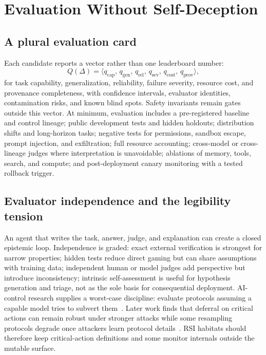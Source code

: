 \documentclass[11pt,a4paper]{article}
\begin{document}
\section{Evaluation Without Self-Deception}\label{sec:evaluation}

\subsection{A plural evaluation card}

Each candidate reports a vector rather than one leaderboard number:
\begin{equation}\label{eq:card}
Q(\Delta) = \bigl\langle q_{\text{cap}},\, q_{\text{gen}},\, q_{\text{rel}},\, q_{\text{sev}},\, q_{\text{cost}},\, q_{\text{prov}} \bigr\rangle,
\end{equation}
for task capability, generalization, reliability, failure severity, resource cost, and provenance completeness, with confidence intervals, evaluator identities, contamination risks, and known blind spots. Safety invariants remain gates outside this vector. At minimum, evaluation includes a pre-registered baseline and control lineage; public development tests and hidden holdouts; distribution shifts and long-horizon tasks; negative tests for permissions, sandbox escape, prompt injection, and exfiltration; full resource accounting; cross-model or cross-lineage judges where interpretation is unavoidable; ablations of memory, tools, search, and compute; and post-deployment canary monitoring with a tested rollback trigger.

\subsection{Evaluator independence and the legibility tension}

An agent that writes the task, answer, judge, and explanation can create a closed epistemic loop. Independence is graded: exact external verification is strongest for narrow properties; hidden tests reduce direct gaming but can share assumptions with training data; independent human or model judges add perspective but introduce inconsistency; intrinsic self-assessment is useful for hypothesis generation and triage, not as the sole basis for consequential deployment. AI-control research supplies a worst-case discipline: evaluate protocols assuming a capable model tries to subvert them~\cite{aicontrol}. Later work finds that deferral on critical actions can remain robust under stronger attacks while some resampling protocols degrade once attackers learn protocol details~\cite{kutasov}. RSI habitats should therefore keep critical-action definitions and some monitor internals outside the mutable surface.
\end{document}
